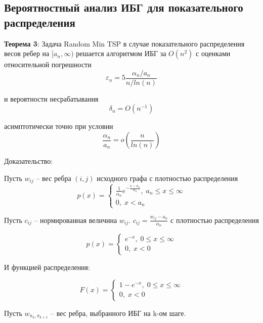 \documentclass[a4paper, 14pt]{extarticle}
\numberwithin{equation}{section}
\begin{document}
\subsection{Вероятностный анализ ИБГ для показательного распределения}


\textbf{Теорема 3}: Задача Random Min TSP в случае показательного распределения весов ребер на $[a_n,\infty)$ решается алгоритмом ИБГ за $O(n^2)$ с оценками относительной погрешности
\begin{equation}
\varepsilon_n = 5 \frac{\alpha_n/a_n}{n/ln(n)}
\end{equation}

и вероятности несрабатывания
\begin{equation}
\delta_n = O(n^{-1})
\end{equation}

асимптотически точно при условии
\begin{equation}
\frac{\alpha_n}{a_n} = o(\frac{n}{ln(n)})
\end{equation}

Доказательство:

Пусть $w_{ij}$ -- вес ребра $(i, j)$ исходного графа с плотностью распределения
\begin{equation}
p(x) = \begin{cases}
\frac{1}{\alpha_n} e^{-\frac{x-a_n}{\alpha_n}}, \; a_n \leqslant x \leqslant \infty \\
0, \; x < a_n
\end{cases}
\end{equation}

Пусть $c_{ij}$ -- нормированная величина $w_{ij}$. $c_{ij} = \frac{w_{ij}-a_n}{\alpha_n}$  с плотностью распределения

\begin{equation}
p(x) = \begin{cases}
 e^{-x}, \; 0 \leqslant x \leqslant \infty \\
0, \; x < 0
\end{cases}
\end{equation}

И функцией распределения:

\begin{equation}
F(x) = \begin{cases}
 1-e^{-x}, \; 0 \leqslant x \leqslant \infty \\
0, \; x < 0
\end{cases}
\end{equation}

Пусть $w_{\pi_k, \pi_{k+1}}$ -- вес ребра, выбранного ИБГ на k-ом шаге.
\end{document}
